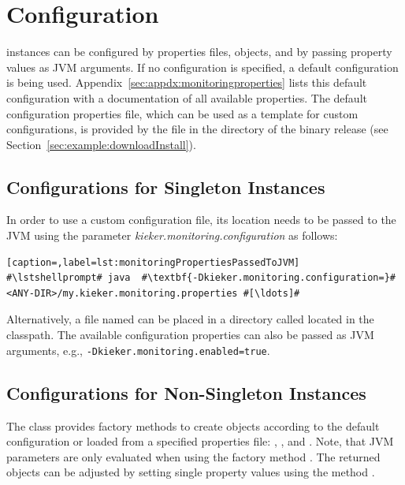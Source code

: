 \section{\KiekerMonitoringPart{} Configuration}\label{sec:monitoring:configuration}

\KiekerMonitoringPart{} instances can be configured by properties files, %
 objects, and by passing property values as %
JVM arguments. If no configuration is specified, a default %
configuration is being used. %
Appendix~\ref{sec:appdx:monitoringproperties} lists this default %
configuration with a documentation of all available properties. %
The default configuration properties file, which %
can be used as a template for custom configurations, is provided by the file %
\file{\monitoringPropertiesFile} in the directory  of %
the binary release (see Section~\ref{sec:example:downloadInstall}). %


\subsection*{Configurations for Singleton Instances}

In order to use a custom configuration file, its location needs to be passed to %
the JVM using the parameter \textit{kieker.monitoring.configuration} as follows:

\setBashListing
\begin{lstlisting}[caption=,label=lst:monitoringPropertiesPassedToJVM]
#\lstshellprompt# java  #\textbf{-Dkieker.monitoring.configuration=}#<ANY-DIR>/my.kieker.monitoring.properties #[\ldots]#
\end{lstlisting}

\noindent Alternatively, a file named  %
can be placed in a directory called  located in the classpath. %
The available configuration properties can also be passed as JVM %
arguments, e.g., \lstinline{-Dkieker.monitoring.enabled=true}. %

\subsection*{Configurations for Non-Singleton Instances}

The class  provides factory methods to create %
 objects according to the default configuration %
or loaded from a specified properties file: , %
, and . %
Note, that JVM parameters are only evaluated when using the factory method %
. %
The returned  objects can be adjusted by setting %
single property values using the method . %

